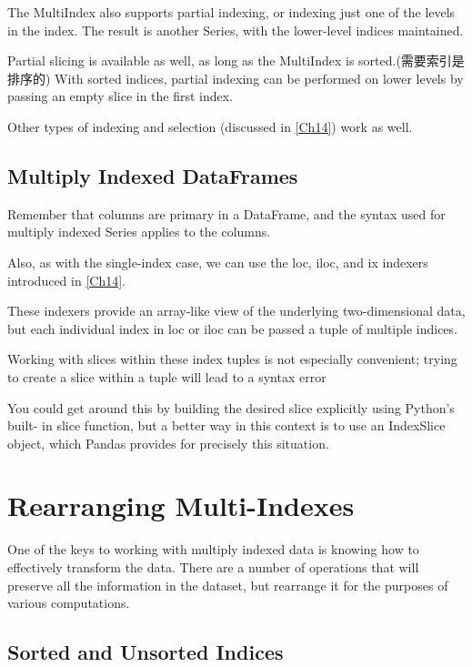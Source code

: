 The MultiIndex also supports partial indexing, or indexing just one of the levels in
the index. The result is another Series, with the lower-level indices maintained.

Partial slicing is available as well, as long as the MultiIndex is sorted.(需要索引是排序的) With sorted indices, partial indexing can be performed on lower levels by passing an
empty slice in the first index.

Other types of indexing and selection (discussed in \autoref{Ch14}) work as well.

\subsection*{Multiply Indexed DataFrames}

Remember that columns are primary in a DataFrame, and the syntax used for multiply indexed Series applies to the columns.

Also, as with the single-index case, we can use the loc, iloc, and ix indexers introduced in \autoref{Ch14}.

These indexers provide an array-like view of the underlying two-dimensional data,
but each individual index in loc or iloc can be passed a tuple of multiple indices.

Working with slices within these index tuples is not especially convenient; trying to
create a slice within a tuple will lead to a syntax error

You could get around this by building the desired slice explicitly using Python’s built-
in slice function, but a better way in this context is to use an IndexSlice object,
which Pandas provides for precisely this situation.

\section{Rearranging Multi-Indexes}
One of the keys to working with multiply indexed data is knowing how to effectively
transform the data. There are a number of operations that will preserve all the information in the dataset, but rearrange it for the purposes of various computations.
\subsection{Sorted and Unsorted Indices}

